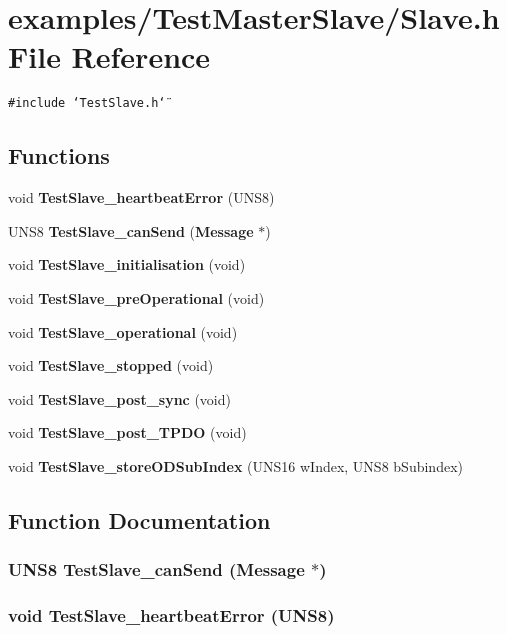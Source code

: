 \section{examples/Test\-Master\-Slave/Slave.h File Reference}
\label{Slave_8h}
{\tt \#include \char`\"{}Test\-Slave.h\char`\"{}}\par
\subsection*{Functions}
\begin{CompactItemize}
\item 
void {\bf Test\-Slave\_\-heartbeat\-Error} (UNS8)
\item 
UNS8 {\bf Test\-Slave\_\-can\-Send} ({\bf Message} $\ast$)
\item 
void {\bf Test\-Slave\_\-initialisation} (void)
\item 
void {\bf Test\-Slave\_\-pre\-Operational} (void)
\item 
void {\bf Test\-Slave\_\-operational} (void)
\item 
void {\bf Test\-Slave\_\-stopped} (void)
\item 
void {\bf Test\-Slave\_\-post\_\-sync} (void)
\item 
void {\bf Test\-Slave\_\-post\_\-TPDO} (void)
\item 
void {\bf Test\-Slave\_\-store\-ODSub\-Index} (UNS16 w\-Index, UNS8 b\-Subindex)
\end{CompactItemize}


\subsection{Function Documentation}
\subsubsection{\setlength{\rightskip}{0pt plus 5cm}UNS8 Test\-Slave\_\-can\-Send ({\bf Message} $\ast$)}\label{Slave_8h_7d9cc68cd28289d8ce0449cc69252041}


\subsubsection{\setlength{\rightskip}{0pt plus 5cm}void Test\-Slave\_\-heartbeat\-Error (UNS8)}\label{Slave_8h_3b6e386d835d62130c852cd252282b7c}


